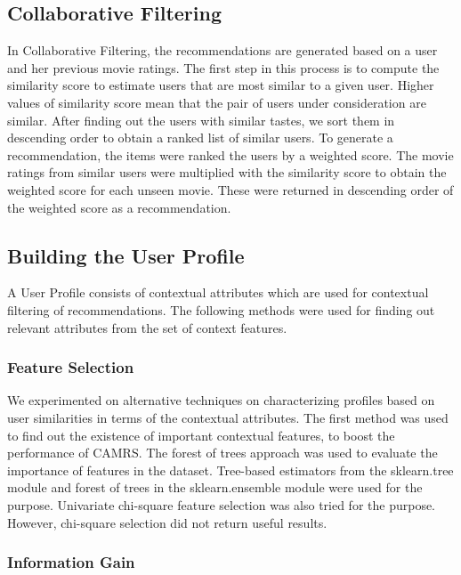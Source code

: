 \documentclass{article}
\begin{document}
\subsection{Collaborative Filtering}
In Collaborative Filtering, the recommendations are generated based on a user and her previous movie ratings. The first step in this process is to compute the similarity score to estimate users that are most similar to a given user. Higher values of similarity score mean that the pair of users under consideration are similar. After finding out the users with similar tastes, we sort them in descending order to obtain a ranked list of similar users. To generate a recommendation, the items were ranked the users by a weighted score. The movie ratings from similar users were multiplied with the similarity score to obtain the weighted score for each unseen movie. These were returned in descending order of the weighted score as a recommendation. \cite{segaran2008programming}  

\subsection{Building the User Profile}

A User Profile consists of contextual attributes which are used for contextual filtering of recommendations. The following methods were used for finding out relevant attributes from the set of context features.

\subsubsection{Feature Selection}

We experimented on alternative techniques on characterizing profiles based on user similarities in terms of the contextual attributes. The first method was used to find out the existence of important contextual features, to boost the performance of CAMRS. The forest of trees approach was used to evaluate the importance of features in the dataset. Tree-based estimators from the sklearn.tree module and forest of trees in the sklearn.ensemble module were used for the purpose\cite{scikit-learn}. Univariate chi-square feature selection was also tried for the purpose. However, chi-square selection did not return useful results.

\subsubsection{Information Gain}
\end{document}
